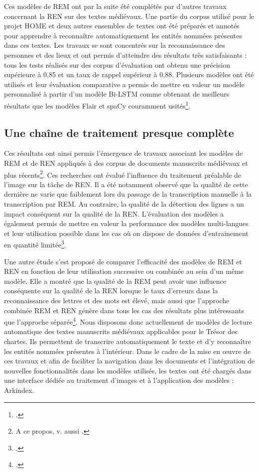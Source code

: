 \documentclass[a4paper,12pt,twoside]{book}
\begin{document}
	Ces modèles de REM ont par la suite été complétés par d'autres travaux concernant la REN sur des textes médiévaux. Une partie du corpus utilisé pour le projet HOME et deux autres ensembles de textes ont été préparés et annotés pour apprendre à reconnaître automatiquement les entités nommées présentes dans ces textes. Les travaux se sont concentrés sur la reconnaissance des personnes et des lieux et ont permis d'atteindre des résultats très satisfaisants : tous les tests réalisés sur des corpus d'évaluation ont obtenu une précision supérieure à 0,85 et un taux de rappel supérieur à 0,88. Plusieurs modèles ont été utilisés et leur évaluation comparative a permis de mettre en valeur un modèle personnalisé à partir d'un modèle Bi-LSTM comme obtenant de meilleurs résultats que les modèles Flair et spaCy couramment usités\footcite{torres_aguilar_named_2021}.
	
	\subsection{Une chaîne de traitement presque complète}
	
	Ces résultats ont ainsi permis l'émergence de travaux associant les modèles de REM et de REN appliqués à des corpus de documents manuscrits médiévaux et plus récents\footnote{A ce propos, v. aussi \cite{scheithauer_reconnaissanc_2021}.}. Ces recherches ont évalué l'influence du traitement préalable de l'image sur la tâche de REN. Il a été notamment observé que la qualité de cette dernière ne varie que faiblement lors du passage de la transcription manuelle à la transcription par REM. Au contraire, la qualité de la détection des lignes a un impact conséquent sur la qualité de la REN. L'évaluation des modèles a également permis de mettre en valeur la performance des modèles multi-langues et leur utilisation possible dans les cas où on dispose de données d'entrainement en quantité limitée\footcite{monroc_comprehensive_2022}. 
	
	Une autre étude s'est proposé de comparer l'efficacité des modèles de REM et REN en fonction de leur utilisation successive ou combinée au sein d'un même modèle. Elle a montré que la qualité de la REM peut avoir une influence conséquente sur la qualité de la REN lorsque le taux d'erreurs dans la reconnaissance des lettres et des mots est élevé, mais aussi que l'approche combinée REM et REN génère dans tous les cas des résultats plus intéressants que l'approche séparée\footcite{boros_comparison_2020}. Nous disposons donc actuellement de modèles de lecture automatique des textes manuscrits médiévaux applicables pour le Trésor des chartes. Ils permettent de transcrire automatiquement le texte et d'y reconnaître les entités nommées présentes à l'intérieur. Dans le cadre de la mise en œuvre de ces travaux et afin de faciliter la navigation dans les documents et l'intégration de nouvelles fonctionnalités dans les modèles utilisés, les textes ont été chargés dans une interface dédiée au traitement d'images et à l'application des modèles : Arkindex.
	
\end{document}
